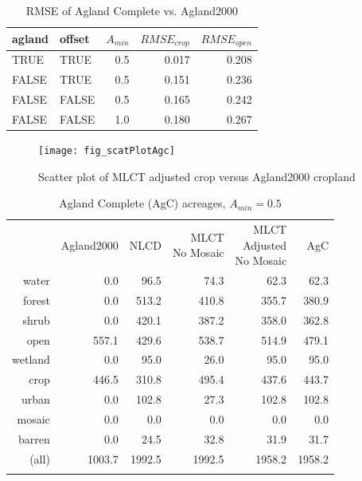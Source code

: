 \begin{table}[ht]
\begin{center}
\begin{tabular}{llrrr}
  \hline
agland & offset & $A_{min}$ & $RMSE_{crop}$ & $RMSE_{open}$ \\ 
  \hline
TRUE & TRUE & 0.5 & 0.017 & 0.208 \\ 
  FALSE & TRUE & 0.5 & 0.151 & 0.236 \\ 
  FALSE & FALSE & 0.5 & 0.165 & 0.242 \\ 
  FALSE & FALSE & 1.0 & 0.180 & 0.267 \\ 
   \hline
\end{tabular}
\caption{RMSE of Agland Complete vs. Agland2000}
\label{tab:rmse3}
\end{center}
\end{table}
\begin{figure}[hpt] 
  \begin{center} 


    \texttt{[image: fig\_scatPlotAgc]}
  \end{center} 
  \caption{Scatter plot of MLCT adjusted crop versus Agland2000 cropland}
  \label{fig:scatPlotAgc} 
\end{figure} 

\begin{table}[ht]
\begin{center}
{\small
\begin{tabular}{rrrrrr}
  \hline
 & Agland2000 & NLCD & \pbox[c][][c]{3in}{MLCT\\No Mosaic} & \pbox[c][][c]{3in}{\smallskip{}MLCT\\Adjusted\\No Mosaic} & AgC \\ 
  \noalign{\smallskip} \hline
water & 0.0 & 96.5 & 74.3 & 62.3 & 62.3 \\ 
  forest & 0.0 & 513.2 & 410.8 & 355.7 & 380.9 \\ 
  shrub & 0.0 & 420.1 & 387.2 & 358.0 & 362.8 \\ 
  open & 557.1 & 429.6 & 538.7 & 514.9 & 479.1 \\ 
  wetland & 0.0 & 95.0 & 26.0 & 95.0 & 95.0 \\ 
  crop & 446.5 & 310.8 & 495.4 & 437.6 & 443.7 \\ 
  urban & 0.0 & 102.8 & 27.3 & 102.8 & 102.8 \\ 
  mosaic & 0.0 & 0.0 & 0.0 & 0.0 & 0.0 \\ 
  barren & 0.0 & 24.5 & 32.8 & 31.9 & 31.7 \\ 
  (all) & 1003.7 & 1992.5 & 1992.5 & 1958.2 & 1958.2 \\ 
   \noalign{\smallskip} \hline
\end{tabular}
}
\caption{Agland Complete (AgC) acreages, $A_{min}=0.5$}
\label{tab:areas3}
\end{center}
\end{table}

